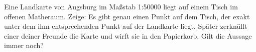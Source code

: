 \begin{prob}
Eine Landkarte von Augsburg im Ma\ss stab 1:50000 liegt auf einem Tisch im offenen Matheraum. Zeige: Es gibt genau einen Punkt auf dem Tisch, der exakt unter dem ihm entsprechenden Punkt auf der Landkarte liegt.
Später zerknüllt einer deiner Freunde die Karte und wirft sie in den Papierkorb. Gilt die Aussage immer noch?
\end{prob}
